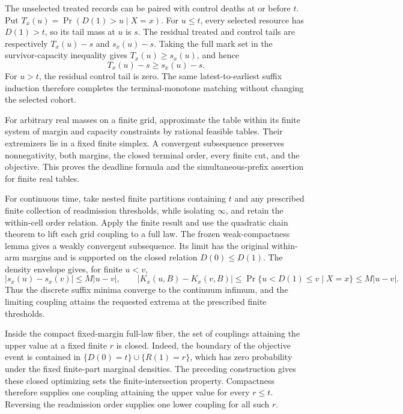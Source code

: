 The unselected treated records can be paired with control deaths at or before \(t\).  Put \(T_x(u)=\Pr(D(1)>u\mid X=x)\).  For \(u\leq t\), every selected resource has \(D(1)>t\), so its tail mass at \(u\) is \(s\).  The residual treated and control tails are respectively \(T_x(u)-s\) and \(s_x(u)-s\).  Taking the full mark set in the survivor-capacity inequality gives \(T_x(u)\geq s_x(u)\), and hence
\[
T_x(u)-s\geq s_x(u)-s.                                               \tag{15}
\]
For \(u>t\), the residual control tail is zero.  The same latest-to-earliest suffix induction therefore completes the terminal-monotone matching without changing the selected cohort.

For arbitrary real masses on a finite grid, approximate the table within its finite system of margin and capacity constraints by rational feasible tables.  Their extremizers lie in a fixed finite simplex.  A convergent subsequence preserves nonnegativity, both margins, the closed terminal order, every finite cut, and the objective.  This proves the deadline formula and the simultaneous-prefix assertion for finite real tables.

For continuous time, take nested finite partitions containing \(t\) and any prescribed finite collection of readmission thresholds, while isolating \(\infty\), and retain the within-cell order relation.  Apply the finite result and use the quadratic chain theorem to lift each grid coupling to a full law.  The frozen weak-compactness lemma gives a weakly convergent subsequence.  Its limit has the original within-arm margins and is supported on the closed relation \(D(0)\leq D(1)\).  The density envelope gives, for finite \(u<v\),
\[
|s_x(u)-s_x(v)|\leq M|u-v|,
\qquad
|K_x(u,B)-K_x(v,B)|
\leq\Pr\{u<D(1)\leq v\mid X=x\}
\leq M|u-v|.                                                         \tag{16}
\]
Thus the discrete suffix minima converge to the continuum infimum, and the limiting coupling attains the requested extrema at the prescribed finite thresholds.

Inside the compact fixed-margin full-law fiber, the set of couplings attaining the upper value at a fixed finite \(r\) is closed.  Indeed, the boundary of the objective event is contained in \(\{D(0)=t\}\cup\{R(1)=r\}\), which has zero probability under the fixed finite-part marginal densities.  The preceding construction gives these closed optimizing sets the finite-intersection property.  Compactness therefore supplies one coupling attaining the upper value for every \(r\leq t\).  Reversing the readmission order supplies one lower coupling for all such \(r\).

